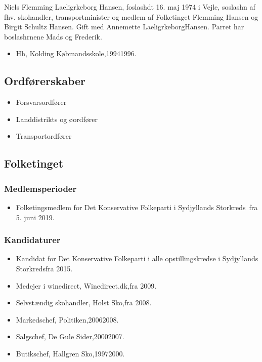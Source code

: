 \documentclass[11pt, a4paper]{awesome-cv}
\begin{document}
\makecvheader[R]
\makelettertitle
\begin{cvletter}
Niels Flemming Laeligrkeborg Hansen, foslashdt 16. maj 1974 i Vejle, soslashn af fhv. skohandler, transportminister og medlem af Folketinget Flemming Hansen og Birgit Schultz Hansen. Gift med Annemette LaeligrkeborgHansen. Parret har boslashrnene Mads og Frederik.

\begin{itemize}
\item Hh, Kolding Købmandsskole,19941996.
\end{itemize}
\subsection*{Ordførerskaber}
\begin{itemize}
\item Forsvarsordfører
\item Landdistrikts og øordfører
\item Transportordfører
\end{itemize}
\subsection*{Folketinget}
\subsubsection*{Medlemsperioder}
\begin{itemize}
\item Folketingsmedlem for Det Konservative Folkeparti i Sydjyllands Storkreds fra 5. juni 2019.
\end{itemize}
\subsubsection*{Kandidaturer}
\begin{itemize}
\item Kandidat for Det Konservative Folkeparti i alle opstillingskredse i Sydjyllands Storkredsfra 2015.
\end{itemize}
\begin{itemize}
\item Medejer i winedirect, Winedirect.dk,fra 2009.
\item Selvstændig skohandler, Holst Sko,fra 2008.
\item Markedschef, Politiken,20062008.
\item Salgschef, De Gule Sider,20002007.
\item Butikschef, Hallgren Sko,19972000.
\end{itemize}
\end{cvletter}
\end{document}

